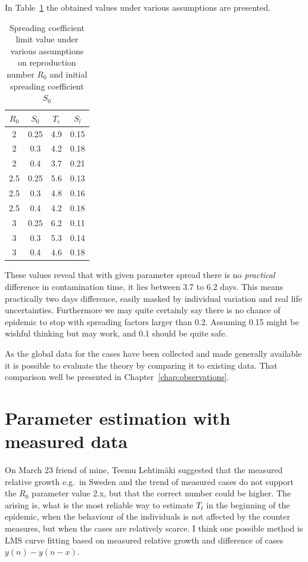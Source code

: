 In Table~\ref{tab:variants} the obtained values under various assumptions are
presented.
\begin{table}[h!]
  \begin{center}
      \caption{Spreading coefficient limit value under various assumptions on
      reproduction number $R_0$ and initial spreading coefficient $S_0$}\label{tab:variants}
   \begin{tabular}{c|c|c|c} %
        \textbf{$R_0$} & \textbf{$S_0$} & \textbf{$T_c$} & \textbf{$S_l$}\\
      \hline
      2 &0.25&4.9&0.15 \\
      2 &0.3&4.2&0.18\\
      2 &0.4&3.7&0.21\\
      2.5&0.25&5.6&0.13\\
      2.5&0.3&4.8&0.16\\
      2.5&0.4&4.2&0.18\\
      3 &0.25&6.2&0.11\\
      3 &0.3&5.3&0.14\\
      3 &0.4&4.6&0.18\\
    \end{tabular}
  \end{center}
\end{table}
These values reveal that with given parameter spread there is no
\emph{practical} difference in contamination time, it lies between 3.7 to 6.2
days. This means practically two days difference, easily masked by individual
variation and real life uncertainties. 
Furthermore we may quite
certainly say there is no chance of epidemic to stop with spreading factors
larger than 0.2. Assuming 0.15 might be wishful thinking but may work, and 0.1 should be
quite safe. 

As the global data for the cases have been collected and made generally
available it is possible to evaluate the theory by comparing it to
existing data. That comparison well be presented in Chapter~\ref{chap:observations}.

\section{Parameter estimation with measured data}
On March 23 friend of mine,  Teemu Lehtimäki suggested that the measured
relative growth e.g.\ in Sweden and the trend of measured cases do not support
the $R_0$ parameter value 2.x, but that the correct number could be higher. The
arising is, what is the most reliable way to estimate $T_t$ in the beginning
of the epidemic, when the behaviour of the individuals is not affected by the
counter measures, but when the cases are relatively scarce. I think one
possible 
method is LMS curve fitting based on measured relative growth and difference
of cases $y\left(n\right)-y\left(n-x\right)$. 

